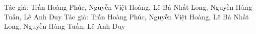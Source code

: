 \newcommand{\AuthorOne}{Trần Hoàng Phúc}
\newcommand{\AuthorTwo}{Nguyễn Việt Hoàng}
\newcommand{\AuthorThree}{Lê Bá Nhất Long}
\newcommand{\AuthorFour}{Nguyễn Hùng Tuấn}
\newcommand{\AuthorFive}{Lê Anh Duy}
\newcommand{\AuthorNames}{\AuthorOne, \AuthorTwo, \AuthorThree, \AuthorFour, \AuthorFive}

\newcommand{\EmailOne}{21522479@gm.uit.edu.vn}
\newcommand{\EmailTwo}{21522095@gm.uit.edu.vn}
\newcommand{\EmailThree}{21522300@gm.uit.edu.vn}
\newcommand{\EmailFour}{21521633@gm.uit.edu.vn}
\newcommand{\EmailFive}{21521994@gm.uit.edu.vn}

\newcommand{\University}{Trường Đại học Công nghệ Thông tin - UIT}
\newcommand{\FacultyOne}{Khoa Hệ thống thông tin}
\newcommand{\Location}{TP. Hồ Chí Minh, Việt Nam}



\author{\MakeUppercase{\AuthorOne}, \MakeUppercase{\AuthorTwo}, \MakeUppercase{\AuthorThree}, \MakeUppercase{\AuthorFour}, và \MakeUppercase{\AuthorFive}}

\address[1]{\FacultyOne, \University, (e-mail: \EmailOne)}
\address[2]{\FacultyOne, \University, (e-mail: \EmailTwo)}
\address[3]{\FacultyOne, \University, (e-mail: \EmailThree)}
\address[4]{\FacultyOne, \University, (e-mail: \EmailFour)}
\address[5]{\FacultyOne, \University, (e-mail: \EmailFive)}

\markboth
{Tác giả: \AuthorNames}
{Tác giả: \AuthorNames}
